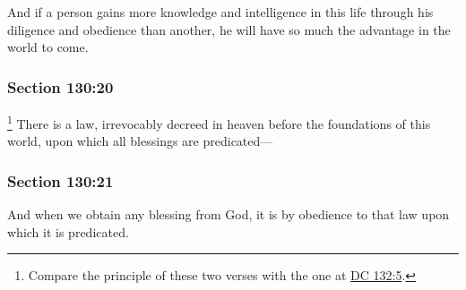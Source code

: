 		And if a person gains more knowledge and intelligence in this life through his diligence and obedience than another, he will have so much the advantage in the world to come.


	\subsubsection{Section 130:20} %
		\label{DC130-20}

			\footnote{%
				Compare the principle of these two verses with the one at \hyperref[DC132-5]{DC 132:5}.
				}%
		There is a law, irrevocably decreed in heaven before the foundations of this world, upon which all blessings are predicated---


	\subsubsection{Section 130:21} %
		\label{DC130-21}

		And when we obtain any blessing from God, it is by obedience to that law upon which it is predicated.


